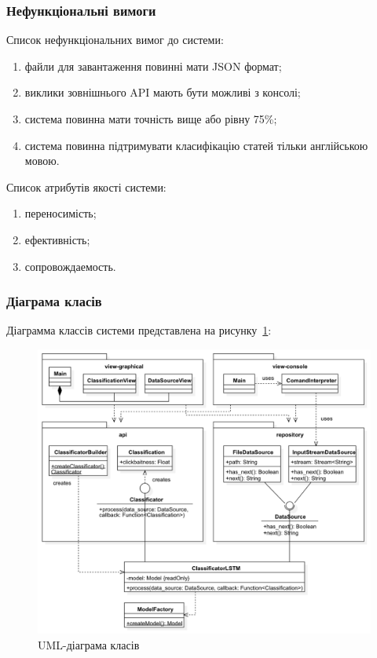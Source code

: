 \subsubsection{Нефункціональні вимоги}
Список нефункціональних вимог до системи:
\begin{enumerate}[label={\arabic*)}]
	\item файли для завантаження повинні мати JSON формат;
    \item виклики зовнішнього API мають бути можливі з консолі;
    \item система повинна мати точність вище або рівну 75\%;
    \item система повинна підтримувати класифікацію статей тільки англійською мовою.
\end{enumerate}

Список атрибутів якості системи:
\begin{enumerate}[label={\arabic*)}]
	\item переносимість;
    \item ефективність;
    \item сопровождаемость.
\end{enumerate}

\subsubsection{Діаграма класів}
Діаграмма классів системи представлена на рисунку~\ref{fig:class}:

\begin{figure}[H]
	\centering
	\includegraphics[width=\textwidth]{class}
	\caption{UML-діаграма класів}
	\label{fig:class}
\end{figure} 

